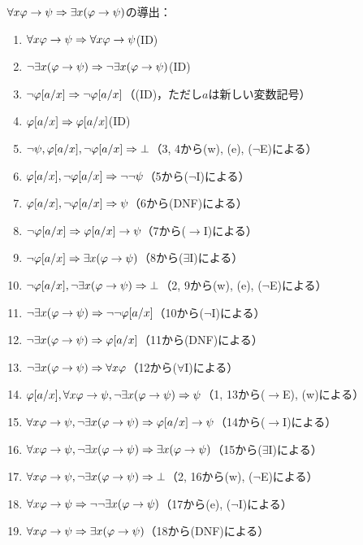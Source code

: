 \(\forall x \varphi \to \psi \sequent \exists x \paren{\varphi \to \psi}\)の導出：
\begin{enumerate}
	\item \(\forall x \varphi \to \psi \Rightarrow \forall x \varphi \to \psi\)\quad (ID)
	\item \(\lnot \exists x \paren{\varphi \to \psi} \sequent \lnot \exists x \paren{\varphi \to \psi}\)\quad (ID)
	\item \(\lnot \subst{\varphi}{a/x} \sequent \lnot \subst{\varphi}{a/x}\)\quad （(ID)，ただし\(a\)は新しい変数記号）
	\item \(\subst{\varphi}{a/x} \sequent \subst{\varphi}{a/x}\)\quad (ID)
	\item \(\lnot \psi, \subst{\varphi}{a/x}, \lnot \subst{\varphi}{a/x} \sequent \bot\)\quad （3, 4から(w), (e), (\(\lnot\)E)による）
	\item \(\subst{\varphi}{a/x}, \lnot \subst{\varphi}{a/x} \sequent \lnot \lnot \psi\)\quad （5から(\(\lnot\)I)による）
	\item \(\subst{\varphi}{a/x}, \lnot \subst{\varphi}{a/x} \sequent \psi\)\quad （6から(DNF)による）
	\item \(\lnot \subst{\varphi}{a/x} \sequent \subst{\varphi}{a/x} \to \psi\)\quad （7から(\(\to\)I)による）
	\item \(\lnot \subst{\varphi}{a/x} \sequent \exists x \paren{\varphi \to \psi}\)\quad （8から(\(\exists\)I)による）
	\item \(\lnot \subst{\varphi}{a/x}, \lnot \exists x \paren{\varphi \to \psi} \sequent \bot\)\quad （2, 9から(w), (e), (\(\lnot\)E)による）
	\item \(\lnot \exists x \paren{\varphi \to \psi} \sequent \lnot \lnot \subst{\varphi}{a/x}\)\quad （10から(\(\lnot\)I)による）
	\item \(\lnot \exists x \paren{\varphi \to \psi} \sequent \subst{\varphi}{a/x}\)\quad （11から(DNF)による）
	\item \(\lnot \exists x \paren{\varphi \to \psi} \sequent \forall x \varphi\)\quad （12から(\(\forall\)I)による）
	\item \(\subst{\varphi}{a/x}, \forall x \varphi \to \psi, \lnot \exists x \paren{\varphi \to \psi} \sequent \psi\)\quad （1, 13から(\(\to\)E), (w)による）
	\item \(\forall x \varphi \to \psi, \lnot \exists x \paren{\varphi \to \psi} \sequent \subst{\varphi}{a/x} \to \psi\)\quad （14から(\(\to\)I)による）
	\item \(\forall x \varphi \to \psi, \lnot \exists x \paren{\varphi \to \psi} \sequent \exists x \paren{\varphi \to \psi}\)\quad （15から(\(\exists\)I)による）
	\item \(\forall x \varphi \to \psi, \lnot \exists x \paren{\varphi \to \psi} \sequent \bot\)\quad （2, 16から(w), (\(\lnot\)E)による）
	\item \(\forall x \varphi \to \psi \sequent \lnot \lnot \exists x \paren{\varphi \to \psi}\)\quad （17から(e), (\(\lnot\)I)による）
	\item \(\forall x \varphi \to \psi \sequent \exists x \paren{\varphi \to \psi}\)\quad （18から(DNF)による）
\end{enumerate}
